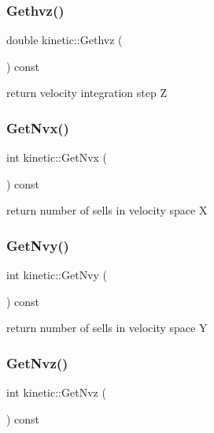 \subsubsection{\texorpdfstring{Gethvz()}{Gethvz()}}
{\footnotesize\ttfamily double kinetic\+::\+Gethvz (\begin{DoxyParamCaption}{ }\end{DoxyParamCaption}) const}



return velocity integration step Z 

\mbox{\label{classkinetic_ab157d454b4a32922a97814ef768a2066}} 
\subsubsection{\texorpdfstring{Get\+Nvx()}{GetNvx()}}
{\footnotesize\ttfamily int kinetic\+::\+Get\+Nvx (\begin{DoxyParamCaption}{ }\end{DoxyParamCaption}) const}



return number of sells in velocity space X 

\mbox{\label{classkinetic_accc79e8415db86b99fba2dae741ecd92}} 
\subsubsection{\texorpdfstring{Get\+Nvy()}{GetNvy()}}
{\footnotesize\ttfamily int kinetic\+::\+Get\+Nvy (\begin{DoxyParamCaption}{ }\end{DoxyParamCaption}) const}



return number of sells in velocity space Y 

\mbox{\label{classkinetic_a38b631033dd32eebf0ba3f4cc1bb0e9d}} 
\subsubsection{\texorpdfstring{Get\+Nvz()}{GetNvz()}}
{\footnotesize\ttfamily int kinetic\+::\+Get\+Nvz (\begin{DoxyParamCaption}{ }\end{DoxyParamCaption}) const}



